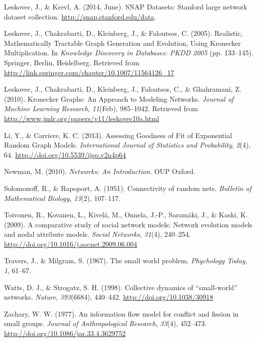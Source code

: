 \documentclass[12pt,twoside]{amherstthesis}
\begin{document}
  \hypertarget{ref-snapnets}{}
  Leskovec, J., \& Krevl, A. (2014, June). SNAP Datasets: Stanford large
  network dataset collection. \url{http://snap.stanford.edu/data}.
  
  \hypertarget{ref-leskovec_realistic_2005}{}
  Leskovec, J., Chakrabarti, D., Kleinberg, J., \& Faloutsos, C. (2005).
  Realistic, Mathematically Tractable Graph Generation and Evolution,
  Using Kronecker Multiplication. In \emph{Knowledge Discovery in
  Databases: PKDD 2005} (pp. 133--145). Springer, Berlin, Heidelberg.
  Retrieved from
  \url{http://link.springer.com/chapter/10.1007/11564126_17}
  
  \hypertarget{ref-leskovec_kronecker_2010}{}
  Leskovec, J., Chakrabarti, D., Kleinberg, J., Faloutsos, C., \&
  Ghahramani, Z. (2010). Kronecker Graphs: An Approach to Modeling
  Networks. \emph{Journal of Machine Learning Research}, \emph{11}(Feb),
  985--1042. Retrieved from
  \url{http://www.jmlr.org/papers/v11/leskovec10a.html}
  
  \hypertarget{ref-li_assessing_2013}{}
  Li, Y., \& Carriere, K. C. (2013). Assessing Goodness of Fit of
  Exponential Random Graph Models. \emph{International Journal of
  Statistics and Probability}, \emph{2}(4), 64.
  \url{http://doi.org/10.5539/ijsp.v2n4p64}
  
  \hypertarget{ref-newman_networks:_2010}{}
  Newman, M. (2010). \emph{Networks: An Introduction}. OUP Oxford.
  
  \hypertarget{ref-solomonoff1951connectivity}{}
  Solomonoff, R., \& Rapoport, A. (1951). Connectivity of random nets.
  \emph{Bulletin of Mathematical Biology}, \emph{13}(2), 107--117.
  
  \hypertarget{ref-toivonen_comparative_2009}{}
  Toivonen, R., Kovanen, L., Kivelä, M., Onnela, J.-P., Saramäki, J., \&
  Kaski, K. (2009). A comparative study of social network models: Network
  evolution models and nodal attribute models. \emph{Social Networks},
  \emph{31}(4), 240--254.
  \url{http://doi.org/10.1016/j.socnet.2009.06.004}
  
  \hypertarget{ref-travers1967small}{}
  Travers, J., \& Milgram, S. (1967). The small world problem.
  \emph{Phychology Today}, \emph{1}, 61--67.
  
  \hypertarget{ref-watts_collective_1998}{}
  Watts, D. J., \& Strogatz, S. H. (1998). Collective dynamics of
  ``small-world'' networks. \emph{Nature}, \emph{393}(6684), 440--442.
  \url{http://doi.org/10.1038/30918}
  
  \hypertarget{ref-zachskarateclub}{}
  Zachary, W. W. (1977). An information flow model for conflict and
  fission in small groups. \emph{Journal of Anthropological Research},
  \emph{33}(4), 452--473. \url{http://doi.org/10.1086/jar.33.4.3629752}


\end{document}
